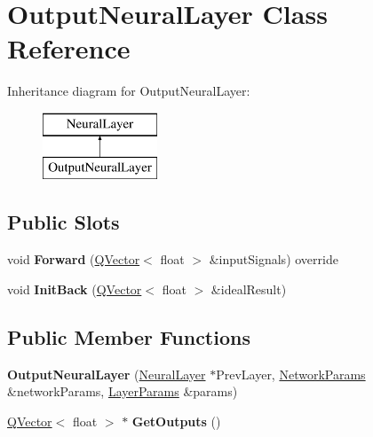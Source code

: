 \hypertarget{class_output_neural_layer}{}\section{Output\+Neural\+Layer Class Reference}
\label{class_output_neural_layer}
Inheritance diagram for Output\+Neural\+Layer\+:\begin{figure}[H]
\begin{center}
\leavevmode
\includegraphics[height=2.000000cm]{class_output_neural_layer}
\end{center}
\end{figure}
\subsection*{Public Slots}
\begin{DoxyCompactItemize}
\item 
\mbox{\label{class_output_neural_layer_a23915415ef771523eaa81ac0d309fdee}} 
void {\bfseries Forward} (\hyperlink{class_q_vector}{Q\+Vector}$<$ float $>$ \&input\+Signals) override
\item 
\mbox{\label{class_output_neural_layer_a88b76a85c6b0df6a08c617a50a51205c}} 
void {\bfseries Init\+Back} (\hyperlink{class_q_vector}{Q\+Vector}$<$ float $>$ \&ideal\+Result)
\end{DoxyCompactItemize}
\subsection*{Public Member Functions}
\begin{DoxyCompactItemize}
\item 
\mbox{\label{class_output_neural_layer_a715832abcf6d3cd49da63c53a48c39ea}} 
{\bfseries Output\+Neural\+Layer} (\hyperlink{class_neural_layer}{Neural\+Layer} $\ast$Prev\+Layer, \hyperlink{struct_perceptron_1_1_network_params}{Network\+Params} \&network\+Params, \hyperlink{struct_perceptron_1_1_layer_params}{Layer\+Params} \&params)
\item 
\mbox{\label{class_output_neural_layer_a6506d3323ab55502c0bc5e925179495b}} 
\hyperlink{class_q_vector}{Q\+Vector}$<$ float $>$ $\ast$ {\bfseries Get\+Outputs} ()
\end{DoxyCompactItemize}
